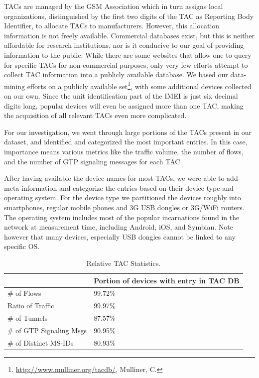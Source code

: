 \acp{TAC} are managed by the GSM Association which in turn assigns local organizations, distinguished by the first two digits of the \ac{TAC} as Reporting Body Identifier, to allocate \acp{TAC} to manufacturers. However, this allocation information is not freely available. Commercial databases exist, but this is neither affordable for research institutions, nor is it conducive to our goal of providing information to the public. While there are some websites that allow one to query for specific \acp{TAC} for non-commercial purposes, only very few efforts attempt to collect \ac{TAC} information into a publicly available database. We based our data-mining efforts on a publicly available set\footnote{\url{http://www.mulliner.org/tacdb/}, Mulliner, C.}, with some additional devices collected on our own. Since the unit identification part of the \ac{IMEI} is just six decimal digits long, popular devices will even be assigned more than one TAC, making the acquisition of all relevant \acp{TAC} even more complicated.

For our investigation, we went through large portions of the \acp{TAC} present in our dataset, and identified and categorized the most important entries. In this case, importance means various metrics like the traffic volume, the number of flows, and the number of \ac{GTP} signaling messages for each \ac{TAC}. 

After having available the device names for most \acp{TAC}, we were able to add meta-information and categorize the entries based on their device type and operating system. For the device type we partitioned the devices roughly into smartphones, regular mobile phones and 3G USB dongles or 3G/WiFi routers. The operating system includes most of the popular incarnations found in the network at measurement time, including Android, iOS, and Symbian. Note however that many devices, especially USB dongles cannot be linked to any specific OS.

\begin{table}
\centering
\caption{Relative \acs{TAC} Statistics.}
\label{tab:tacstats}
\begin{tabular}{|p{4cm}|p{3cm}|} \hline
& \textbf{Portion of devices with entry in TAC DB}\\ \hline
\# of Flows & 99.72\% \\ \hline
Ratio of Traffic & 99.97\%\\ \hline
\# of Tunnels & 87.57\% \\ \hline
\# of GTP Signaling Msgs & 90.95\% \\ \hline
\# of Distinct \acp{MS-ID} & 80.93\%\\ \hline
\end{tabular}
\end{table}

